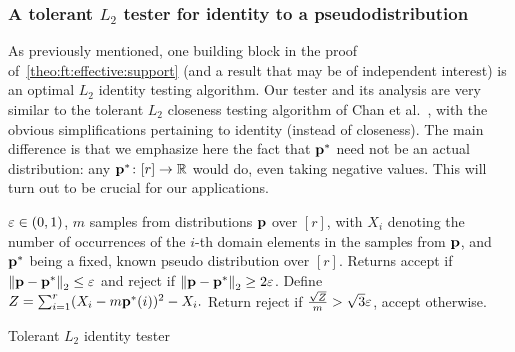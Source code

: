 \subsubsection{A tolerant $L_2$ tester for identity to a pseudodistribution}

As previously mentioned, one building block in the proof of~\cref{theo:ft:effective:support} (and a result that may be of independent interest) is an optimal $L_2$ identity testing algorithm. Our tester and its analysis are very similar to the tolerant $L_2$ closeness testing algorithm of Chan et al.~\cite{CDVV:14}, with the obvious simplifications pertaining to identity (instead of closeness). The main difference is that we emphasize here the fact that $\mathbf{p}^\ast$ need not be an actual distribution: any $\mathbf{p}^\ast\colon[r]\to\mathbb{R}$ would do, even taking negative values. This will turn out to be crucial for our applications.

\begin{algorithm}
  \begin{algorithmic}
  \Require $\varepsilon\in(0,1)$, $m$ samples from distributions $\mathbf{p}$ over $[r]$, with $X_i$ denoting the number of occurrences of the $i$-th domain elements in the samples from $\mathbf{p}$, and $\mathbf{p}^\ast$ being a fixed, known pseudo distribution over $[r]$.
  \Ensure Returns \textsf{accept} if ${\lVert\mathbf{p} - \mathbf{p}^\ast {\rVert}}_2 \leq \varepsilon$ and \textsf{reject} if ${\lVert\mathbf{p} - \mathbf{p}^\ast {\rVert}}_2  \geq 2\varepsilon$.
    \State Define $Z=\sum_{i=1}^r (X_i-m\mathbf{p}^\ast(i))^2-X_i.$ 
    \State Return  \textsf{reject} if $\frac{\sqrt{Z}}{m} > \sqrt{3}\varepsilon$, \textsf{accept} otherwise.
  \end{algorithmic}
  \caption{Tolerant $L_2$ identity tester}\label{algo:tol:l2:identity:tester}
\end{algorithm}

